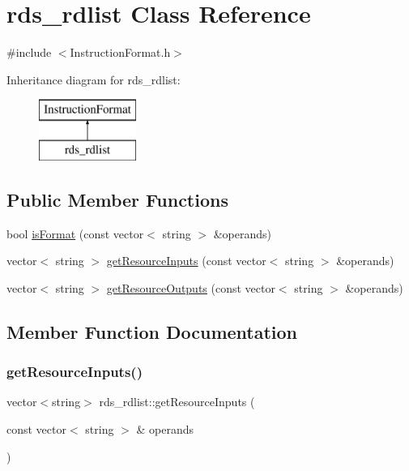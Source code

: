\hypertarget{classrds__rdlist}{}\section{rds\+\_\+rdlist Class Reference}
\label{classrds__rdlist}


{\ttfamily \#include $<$Instruction\+Format.\+h$>$}

Inheritance diagram for rds\+\_\+rdlist\+:\begin{figure}[H]
\begin{center}
\leavevmode
\includegraphics[height=2.000000cm]{classrds__rdlist}
\end{center}
\end{figure}
\subsection*{Public Member Functions}
\begin{DoxyCompactItemize}
\item 
bool \hyperlink{classrds__rdlist_ad3df9613000e862de6ee574509e1bf0c}{is\+Format} (const vector$<$ string $>$ \&operands)
\item 
vector$<$ string $>$ \hyperlink{classrds__rdlist_aaece2a143143616bd8a08665bde1a617}{get\+Resource\+Inputs} (const vector$<$ string $>$ \&operands)
\item 
vector$<$ string $>$ \hyperlink{classrds__rdlist_a42eb3f3d04fec1d67da0b7de1d27ac10}{get\+Resource\+Outputs} (const vector$<$ string $>$ \&operands)
\end{DoxyCompactItemize}


\subsection{Member Function Documentation}
\mbox{\label{classrds__rdlist_aaece2a143143616bd8a08665bde1a617}} 
\subsubsection{\texorpdfstring{get\+Resource\+Inputs()}{getResourceInputs()}}
{\footnotesize\ttfamily vector$<$string$>$ rds\+\_\+rdlist\+::get\+Resource\+Inputs (\begin{DoxyParamCaption}\item[{const vector$<$ string $>$ \&}]{operands }\end{DoxyParamCaption})\hspace{0.3cm}{\ttfamily [virtual]}}

